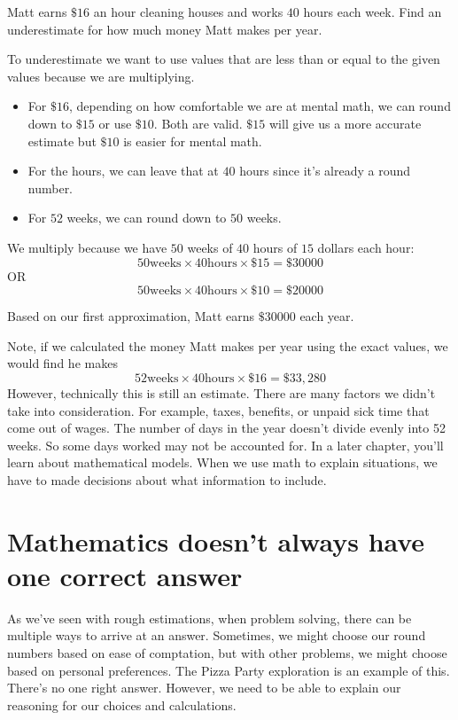 \documentclass{ximera}
\begin{document}
\begin{example}
 Matt earns $\$16$ an hour cleaning houses and works $40$ hours each week. Find an underestimate for how much money Matt makes per year.

\begin{explanation}
To underestimate we want to use values that are less than or equal to the given values because we are multiplying. 
\begin{itemize}
\item For $\$16$, depending on how comfortable we are at mental math, we can round down to $\$15$ or use $\$10$. Both are valid. $\$15$ will give us a more accurate estimate but $\$10$ is easier for mental math.  
\item For the hours, we can leave that at $40$ hours since it's already a round number.
\item For $52$ weeks, we can round down to $50$ weeks.
\end{itemize}

We multiply because we have $50$ weeks of $40$ hours of $15$ dollars each hour:
$$50 \text{weeks} \times 40 \text{hours} \times \$15 =\$30000$$
OR $$50 \text{weeks} \times 40 \text{hours} \times \$10 =\$20000$$

Based on our first approximation, Matt earns $\$30000$ each year.
\end{explanation}
\end{example}

\begin{MM}
Note, if we calculated the money Matt makes per year using the exact values, we would find he makes
$$52 \text{weeks} \times 40 \text{hours} \times \$16 =\$33,280$$ 
However, technically this is still an estimate. There are many factors we didn't take into consideration. For example, taxes, benefits, or unpaid sick time that come out of wages.  The number of days in the year doesn't divide evenly into 52 weeks. So some days worked may not be accounted for.  In a later chapter, you'll learn about mathematical models. When we use math to explain situations, we have to made decisions about what information to include.
\end{MM}


\section{Mathematics doesn't always have one correct answer}

As we've seen with rough estimations, when problem solving, there can be multiple ways to arrive at an answer. Sometimes, we might choose our round numbers based on ease of comptation, but with other problems, we might choose based on personal preferences.  The Pizza Party exploration is an example of this.  There's no one right answer. However, we need to be able to explain our reasoning for our choices and calculations.
\end{document}
